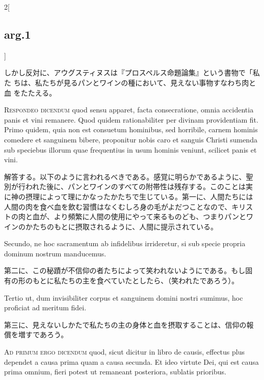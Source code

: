 \documentclass[paper=a4paper,fontsize=10pt,jafontsize=9pt,titlepage]{jlreq}
\begin{document}
\begin{paracol}{2}[\subsection{arg.1}]
\switchcolumn

しかし反対に、アウグスティヌスは『プロスペルス命題論集』という書物で「私た
ちは、私たちが見るパンとワインの種において、見えない事物すなわち肉と血
をたたえる。


{\scshape Respondeo dicendum} quod sensu apparet, facta consecratione,
omnia accidentia panis et vini remanere. Quod quidem rationabiliter
per divinam providentiam fit. Primo quidem, quia non est consuetum
hominibus, sed horribile, carnem hominis comedere et sanguinem bibere,
proponitur nobis caro et sanguis Christi sumenda sub speciebus illorum
quae frequentius in usum hominis veniunt, scilicet panis et vini.

\switchcolumn

解答する。以下のように言われるべきである。感覚に明らかであるように、聖
別が行われた後に、パンとワインのすべての附帯性は残存する。このことは実
に神の摂理によって理にかなったかたちで生じている。第一に、人間たちには
人間の肉を食べ血を飲む習慣はなくむしろ身の毛がよだつことなので、キリス
トの肉と血が、より頻繁に人間の使用にやって来るものども、つまりパンとワ
インのかたちのもとに摂取されるように、人間に提示されている。

\switchcolumn*

Secundo, ne hoc sacramentum ab infidelibus irrideretur, si sub specie
propria dominum nostrum manducemus.

\switchcolumn

第二に、この秘蹟が不信仰の者たちによって笑われないようにである。もし固
有の形のもとに私たちの主を食べていたとしたら、（笑われたであろう）。

\switchcolumn*

Tertio ut, dum invisibiliter corpus et sanguinem domini nostri
sumimus, hoc proficiat ad meritum fidei.

\switchcolumn

第三に、見えないしかたで私たちの主の身体と血を摂取することは、信仰の報
償を増すであろう。

\switchcolumn*[\subsection{ad.1}]

{\scshape Ad primum ergo dicendum} quod, sicut dicitur in libro de
causis, effectus plus dependet a causa prima quam a causa secunda. Et
ideo virtute Dei, qui est causa prima omnium, fieri potest ut
remaneant posteriora, sublatis prioribus.


\end{paracol}
\end{document}
